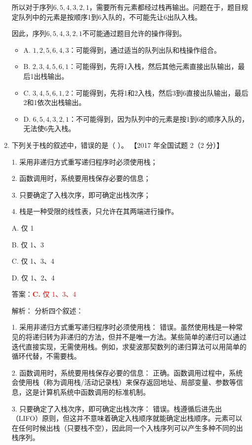 \documentclass[lang=cn,newtx,10pt,scheme=chinese]{../../../elegantbook}
\begin{document}
\begin{enumerate}
    所以对于序列$6, 5, 4, 3, 2, 1$，需要所有元素都经过栈再输出。问题在于，题目规定队列中的元素是按顺序1到6入队的，不可能先让6出队入栈。

    因此，序列$6, 5, 4, 3, 2, 1$不可能通过题目允许的操作得到。

    \begin{itemize}
        \item A. $1, 2, 5, 6, 4, 3$：可能得到，通过适当的队列出队和栈操作组合。
        \item B. $2, 3, 4, 5, 6, 1$：可能得到，先将1入栈，然后其他元素直接出队输出，最后1出栈输出。
        \item C. $3, 4, 5, 6, 1, 2$：可能得到，先将1和2入栈，然后3到6直接出队输出，最后2和1依次出栈输出。
        \item D. $6, 5, 4, 3, 2, 1$：不可能得到，因为队列中的元素是按1到6的顺序入队的，无法使6先入栈。
    \end{itemize}

    \item 下列关于栈的叙述中，错误的是（ ）。  
    【2017 年全国试题 2（2 分）】  

    1. 采用非递归方式重写递归程序时必须使用栈；

    2. 函数调用时，系统要用栈保存必要的信息；  

    3. 只要确定了入栈次序，即可确定出栈次序；  

    4. 栈是一种受限的线性表，只允许在其两端进行操作。  

    A. 仅 1  

    B. 仅 1、3  

    C. 仅 1、3、4  

    D. 仅 1、2、4  

    答案：\textcolor{red}{\textbf{C.} 仅 1、3、4}

    解析：
    分析四个叙述：

    1. 采用非递归方式重写递归程序时必须使用栈：
       错误。虽然使用栈是一种常见的将递归转为非递归的方法，但并不是唯一方法。某些简单的递归可以通过迭代直接实现，无需使用栈。例如，求斐波那契数列的递归算法可以用简单的循环代替，不需要栈。

    2. 函数调用时，系统要用栈保存必要的信息：
       正确。函数调用过程中，系统会使用栈（称为调用栈/活动记录栈）来保存返回地址、局部变量、参数等信息，这是计算机系统中函数调用的标准机制。

    3. 只要确定了入栈次序，即可确定出栈次序：
       错误。栈遵循后进先出（LIFO）原则，但这并不意味着确定入栈顺序就能确定出栈顺序。元素可以在任何时候出栈（只要栈不空），因此同一个入栈序列可以产生多种不同的出栈序列。


\end{enumerate}
\end{document}
